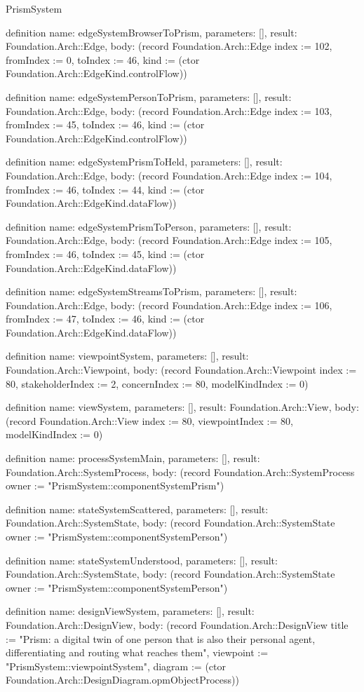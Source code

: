 \begin{lexlean}{PrismSystem}
\begin{semanticmodule}
definition{
  name: edgeSystemBrowserToPrism,
  parameters: [],
  result: Foundation.Arch::Edge,
  body: (record Foundation.Arch::Edge {index := 102, fromIndex := 0, toIndex := 46, kind := (ctor Foundation.Arch::EdgeKind.controlFlow)})
}

definition{
  name: edgeSystemPersonToPrism,
  parameters: [],
  result: Foundation.Arch::Edge,
  body: (record Foundation.Arch::Edge {index := 103, fromIndex := 45, toIndex := 46, kind := (ctor Foundation.Arch::EdgeKind.controlFlow)})
}

definition{
  name: edgeSystemPrismToHeld,
  parameters: [],
  result: Foundation.Arch::Edge,
  body: (record Foundation.Arch::Edge {index := 104, fromIndex := 46, toIndex := 44, kind := (ctor Foundation.Arch::EdgeKind.dataFlow)})
}

definition{
  name: edgeSystemPrismToPerson,
  parameters: [],
  result: Foundation.Arch::Edge,
  body: (record Foundation.Arch::Edge {index := 105, fromIndex := 46, toIndex := 45, kind := (ctor Foundation.Arch::EdgeKind.dataFlow)})
}

definition{
  name: edgeSystemStreamsToPrism,
  parameters: [],
  result: Foundation.Arch::Edge,
  body: (record Foundation.Arch::Edge {index := 106, fromIndex := 47, toIndex := 46, kind := (ctor Foundation.Arch::EdgeKind.dataFlow)})
}

definition{
  name: viewpointSystem,
  parameters: [],
  result: Foundation.Arch::Viewpoint,
  body: (record Foundation.Arch::Viewpoint {index := 80, stakeholderIndex := 2, concernIndex := 80, modelKindIndex := 0})
}

definition{
  name: viewSystem,
  parameters: [],
  result: Foundation.Arch::View,
  body: (record Foundation.Arch::View {index := 80, viewpointIndex := 80, modelKindIndex := 0})
}

definition{
  name: processSystemMain,
  parameters: [],
  result: Foundation.Arch::SystemProcess,
  body: (record Foundation.Arch::SystemProcess {owner := "PrismSystem::componentSystemPrism"})
}

definition{
  name: stateSystemScattered,
  parameters: [],
  result: Foundation.Arch::SystemState,
  body: (record Foundation.Arch::SystemState {owner := "PrismSystem::componentSystemPerson"})
}

definition{
  name: stateSystemUnderstood,
  parameters: [],
  result: Foundation.Arch::SystemState,
  body: (record Foundation.Arch::SystemState {owner := "PrismSystem::componentSystemPerson"})
}

definition{
  name: designViewSystem,
  parameters: [],
  result: Foundation.Arch::DesignView,
  body: (record Foundation.Arch::DesignView {title := "Prism: a digital twin of one person that is also their personal agent, differentiating and routing what reaches them", viewpoint := "PrismSystem::viewpointSystem", diagram := (ctor Foundation.Arch::DesignDiagram.opmObjectProcess)})
}


\end{semanticmodule}
\end{lexlean}
